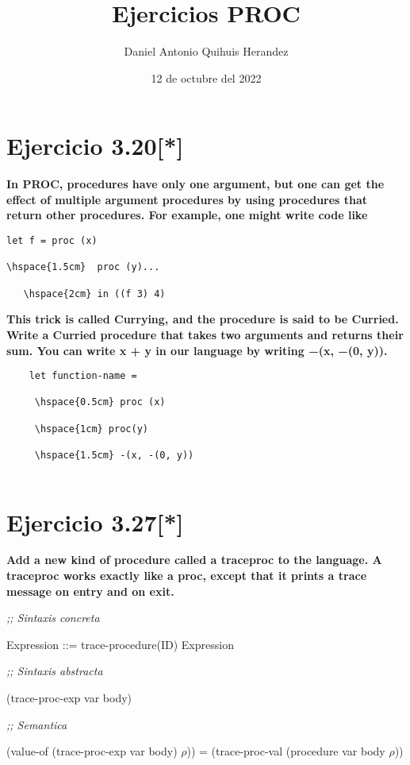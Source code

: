 \documentclass{article}
\title{Ejercicios PROC}
\author{Daniel Antonio Quihuis Herandez }
\date{12 de octubre del 2022}
\begin{document}
\maketitle

\section{Ejercicio 3.20[*]}
\textbf{In PROC, procedures have only one argument, but one can get the
effect of multiple argument procedures by using procedures that return other procedures. For example, one might write code like}


\begin{lstlisting}
let f = proc (x)

\hspace{1.5cm}  proc (y)...

   \hspace{2cm} in ((f 3) 4)
\end{lstlisting}

\textbf{This trick is called Currying, and the procedure is said to be Curried. Write a Curried
procedure that takes two arguments and returns their sum. You can write x + y in our language by writing −(x, −(0, y)).}

\begin{lstlisting}
    let function-name = 
    
     \hspace{0.5cm} proc (x) 
     
     \hspace{1cm} proc(y) 
     
     \hspace{1.5cm} -(x, -(0, y))
    
\end{lstlisting}
\section{Ejercicio 3.27[*]}
\textbf{Add a new kind of procedure called a traceproc to the language.
A traceproc works exactly like a proc, except that it prints a trace message on
entry and on exit.}

\textit{;; Sintaxis concreta } 

\hspace{1cm} Expression ::= trace-procedure(ID) Expression 

\textit{;; Sintaxis abstracta } 

\hspace{1cm} (trace-proc-exp var body) 

\textit{;; Semantica } 

\hspace{1cm} (value-of (trace-proc-exp var body) $\rho$)) = (trace-proc-val (procedure var body $\rho$))
\end{document}
